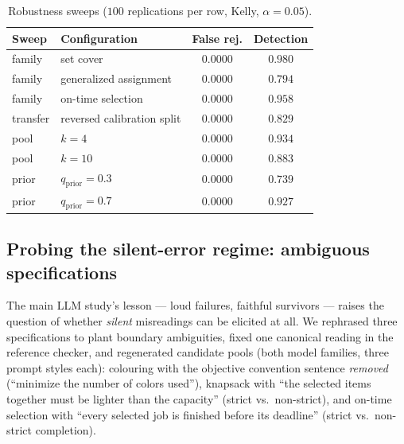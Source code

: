 \documentclass[pdflatex,sn-mathphys-num]{sn-jnl}
\theoremstyle{thmstyleone}
\theoremstyle{thmstyletwo}
\begin{document}
\begin{table}[t]
\caption{Robustness sweeps ($100$ replications per row, Kelly,
$\alpha = 0.05$).}\label{tab:robust}
\begin{tabular}{llcc}
\toprule
Sweep & Configuration & False rej. & Detection\\
\midrule
family & set cover & $0.0000$ & $0.980$\\
family & generalized assignment & $0.0000$ & $0.794$\\
family & on-time selection & $0.0000$ & $0.958$\\
transfer & reversed calibration split & $0.0000$ & $0.829$\\
pool & $k = 4$ & $0.0000$ & $0.934$\\
pool & $k = 10$ & $0.0000$ & $0.883$\\
prior & $q_{\mathrm{prior}} = 0.3$ & $0.0000$ & $0.739$\\
prior & $q_{\mathrm{prior}} = 0.7$ & $0.0000$ & $0.927$\\
\bottomrule
\end{tabular}
\end{table}

\subsection{Probing the silent-error regime: ambiguous
specifications}\label{sec:ambiguity}

The main LLM study's lesson --- loud failures, faithful survivors ---
raises the question of whether \emph{silent} misreadings can be
elicited at all. We rephrased three specifications to plant boundary
ambiguities, fixed one canonical reading in the reference checker,
and regenerated candidate pools (both model families, three prompt
styles each): colouring with the objective convention sentence
\emph{removed} (``minimize the number of colors used''), knapsack
with ``the selected items together must be lighter than the
capacity'' (strict vs.\ non-strict), and on-time selection with
``every selected job is finished before its deadline'' (strict vs.\
non-strict completion).
\end{document}
